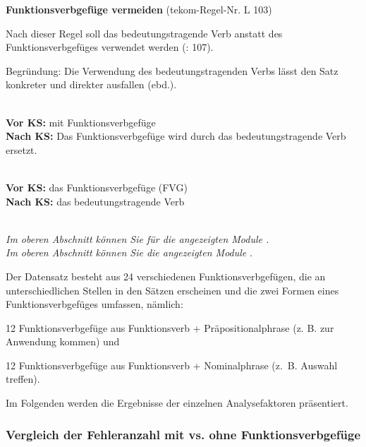 \begin{description}[font=\normalfont\bfseries]
\item [Beschreibung der KS-Regel:] \textbf{Funktionsverbgefüge vermeiden} (tekom-Regel-Nr. L 103)

Nach dieser Regel soll das bedeutungstragende Verb anstatt des Funktionsverbgefüges verwendet werden (\citealt{tekom2013}: 107).

Begründung: Die Verwendung des bedeutungstragenden Verbs lässt den Satz konkreter und direkter ausfallen (ebd.).

\item[Umsetzungsmuster:]
~\\
\textbf{Vor KS:} mit Funktionsverbgefüge\\
\textbf{Nach KS:} Das Funktionsverbgefüge wird durch das bedeutungstragende Verb ersetzt.

\item[KS-Stelle]
~\\
\textbf{Vor KS:} das Funktionsverbgefüge (FVG)\\
\textbf{Nach KS:} das bedeutungstragende Verb

\item[Beispiele]
~\\
\textit{Im oberen Abschnitt können Sie  für die angezeigten Module .}\\
\textit{Im oberen Abschnitt können Sie die angezeigten Module }.

\item[Aufteilung der Testsätze:]
Der Datensatz besteht aus 24 verschiedenen Funktionsverbgefügen, die an unterschiedlichen Stellen in den Sätzen erscheinen und die zwei Formen eines Funktionsverbgefüges umfassen, nämlich:

12 Funktionsverbgefüge aus Funktionsverb + Präpositionalphrase (z. B. zur Anwendung kommen) und

12 Funktionsverbgefüge aus Funktionsverb + Nominalphrase (z.~B. Auswahl treffen).

\end{description}

Im Folgenden werden die Ergebnisse der einzelnen Analysefaktoren präsentiert.


\subsubsection{Vergleich der Fehleranzahl mit vs. ohne Funktionsverbgefüge}
\label{sec:5.3.2.1}

